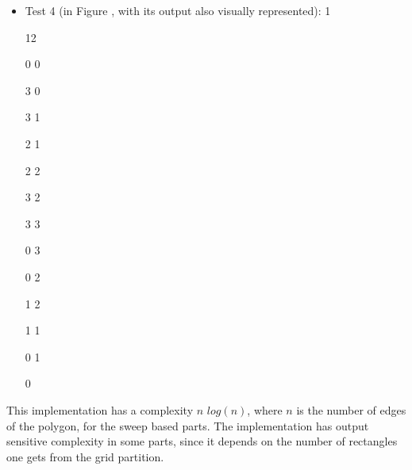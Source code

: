 \documentclass[12pt,a4paper,oneside]{article}
\begin{document}
\begin{itemize}
4 1

6 1

6 0

7 0

7 2

5 2

5 4

3 4

3 6

1 6

1 7

0 7

	\item Test 4 (in Figure , with its output also visually represented): %
1


12

0 0

3 0

3 1

2 1

2 2

3 2

3 3

0 3

0 2

1 2

1 1

0 1

0

\end{itemize}

This implementation has a complexity $n$ $log(n)$, where $n$ is the number of edges of the polygon, for the sweep based parts. The implementation has output sensitive complexity in some parts, since it depends on the number of rectangles one gets from the grid partition.
\end{document}
